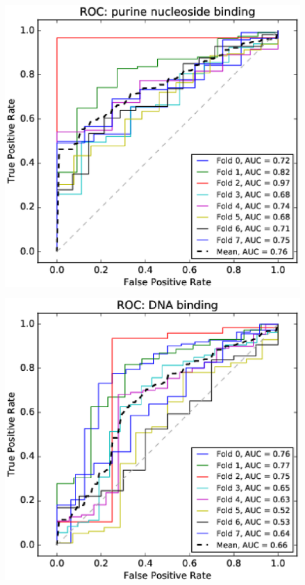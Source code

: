 \documentclass[11pt,twoside,a4paper]{book}
\newenvironment{Figure}
  {\par\medskip\noindent\minipage{\linewidth}}
  {\endminipage\par\medskip}
\begin{document}
\begin{multicols}{2}
\begin{Figure}\begin{center}\includegraphics[width=\linewidth]{figures/roc_purine_nucleoside_binding}\label{fig:roc_purine_nucleoside_binding}\end{center}\end{Figure}
\begin{Figure}\begin{center}\includegraphics[width=\linewidth]{figures/roc_DNA_binding}\label{fig:roc_DNA_binding}\end{center}\end{Figure}

\end{multicols}
\end{document}
